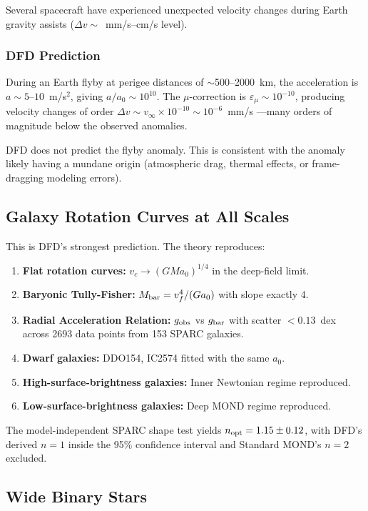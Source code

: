 \documentclass[aps,prd,twocolumn,superscriptaddress,nofootinbib]{revtex4-2}
\begin{document}
Several spacecraft have experienced unexpected velocity changes
during Earth gravity assists ($\Delta v \sim$~mm/s--cm/s level).

\subsubsection{DFD Prediction}

During an Earth flyby at perigee distances of $\sim$500--2000~km,
the acceleration is $a \sim 5$--$10$~m/s$^2$, giving
$a/a_0 \sim 10^{10}$. The $\mu$-correction is
$\varepsilon_\mu \sim 10^{-10}$, producing velocity changes of
order $\Delta v \sim v_\infty\times 10^{-10} \sim 10^{-6}$~mm/s
---many orders of magnitude below the observed anomalies.

DFD does not predict the flyby anomaly. This is consistent with
the anomaly likely having a mundane origin (atmospheric drag,
thermal effects, or frame-dragging modeling errors).

\subsection{Galaxy Rotation Curves at All Scales}

This is DFD's strongest prediction. The theory reproduces:

\begin{enumerate}[nosep]
\item \textbf{Flat rotation curves:} $v_c \to (GMa_0)^{1/4}$
  in the deep-field limit.
\item \textbf{Baryonic Tully-Fisher:} $M_{\rm bar} = v_f^4/(Ga_0)$
  with slope exactly 4.
\item \textbf{Radial Acceleration Relation:} $g_{\rm obs}$ vs
  $g_{\rm bar}$ with scatter $< 0.13$~dex across 2693 data points
  from 153 SPARC galaxies.
\item \textbf{Dwarf galaxies:} DDO154, IC2574 fitted with the
  same $a_0$.
\item \textbf{High-surface-brightness galaxies:} Inner Newtonian
  regime reproduced.
\item \textbf{Low-surface-brightness galaxies:} Deep MOND regime
  reproduced.
\end{enumerate}

The model-independent SPARC shape test yields
$n_{\rm opt} = 1.15 \pm 0.12$, with DFD's derived $n = 1$
inside the 95\% confidence interval and Standard MOND's $n = 2$
excluded.

\subsection{Wide Binary Stars}
\end{document}

